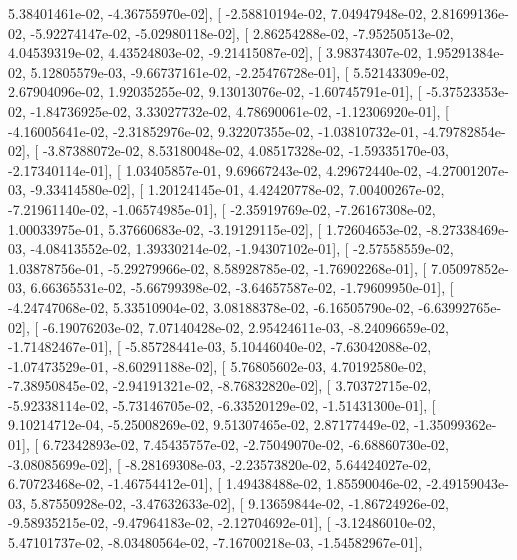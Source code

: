 \documentclass{article}
\begin{document}
          5.38401461e-02,  -4.36755970e-02],
       [ -2.58810194e-02,   7.04947948e-02,   2.81699136e-02,
         -5.92274147e-02,  -5.02980118e-02],
       [  2.86254288e-02,  -7.95250513e-02,   4.04539319e-02,
          4.43524803e-02,  -9.21415087e-02],
       [  3.98374307e-02,   1.95291384e-02,   5.12805579e-03,
         -9.66737161e-02,  -2.25476728e-01],
       [  5.52143309e-02,   2.67904096e-02,   1.92035255e-02,
          9.13013076e-02,  -1.60745791e-01],
       [ -5.37523353e-02,  -1.84736925e-02,   3.33027732e-02,
          4.78690061e-02,  -1.12306920e-01],
       [ -4.16005641e-02,  -2.31852976e-02,   9.32207355e-02,
         -1.03810732e-01,  -4.79782854e-02],
       [ -3.87388072e-02,   8.53180048e-02,   4.08517328e-02,
         -1.59335170e-03,  -2.17340114e-01],
       [  1.03405857e-01,   9.69667243e-02,   4.29672440e-02,
         -4.27001207e-03,  -9.33414580e-02],
       [  1.20124145e-01,   4.42420778e-02,   7.00400267e-02,
         -7.21961140e-02,  -1.06574985e-01],
       [ -2.35919769e-02,  -7.26167308e-02,   1.00033975e-01,
          5.37660683e-02,  -3.19129115e-02],
       [  1.72604653e-02,  -8.27338469e-03,  -4.08413552e-02,
          1.39330214e-02,  -1.94307102e-01],
       [ -2.57558559e-02,   1.03878756e-01,  -5.29279966e-02,
          8.58928785e-02,  -1.76902268e-01],
       [  7.05097852e-03,   6.66365531e-02,  -5.66799398e-02,
         -3.64657587e-02,  -1.79609950e-01],
       [ -4.24747068e-02,   5.33510904e-02,   3.08188378e-02,
         -6.16505790e-02,  -6.63992765e-02],
       [ -6.19076203e-02,   7.07140428e-02,   2.95424611e-03,
         -8.24096659e-02,  -1.71482467e-01],
       [ -5.85728441e-03,   5.10446040e-02,  -7.63042088e-02,
         -1.07473529e-01,  -8.60291188e-02],
       [  5.76805602e-03,   4.70192580e-02,  -7.38950845e-02,
         -2.94191321e-02,  -8.76832820e-02],
       [  3.70372715e-02,  -5.92338114e-02,  -5.73146705e-02,
         -6.33520129e-02,  -1.51431300e-01],
       [  9.10214712e-04,  -5.25008269e-02,   9.51307465e-02,
          2.87177449e-02,  -1.35099362e-01],
       [  6.72342893e-02,   7.45435757e-02,  -2.75049070e-02,
         -6.68860730e-02,  -3.08085699e-02],
       [ -8.28169308e-03,  -2.23573820e-02,   5.64424027e-02,
          6.70723468e-02,  -1.46754412e-01],
       [  1.49438488e-02,   1.85590046e-02,  -2.49159043e-03,
          5.87550928e-02,  -3.47632633e-02],
       [  9.13659844e-02,  -1.86724926e-02,  -9.58935215e-02,
         -9.47964183e-02,  -2.12704692e-01],
       [ -3.12486010e-02,   5.47101737e-02,  -8.03480564e-02,
         -7.16700218e-03,  -1.54582967e-01],
\end{document}
